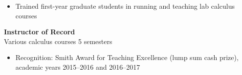 \documentclass[11pt]{article}
\newcommand{\textsb}[1]{ %
  {\fontseries{sb}\selectfont #1}
}
\def\colheight{60.3em}
\def\leftcolwidth{.375\textwidth}
\newcommand{\titlesize}{\large} %
\begin{document}
{\begin{minipage}[t][\colheight]{\leftcolwidth}
{\begin{itemize}
      \item Trained first-year graduate students in running and teaching lab
      calculus courses

    \end{itemize}
  }

  \vfill

  \textbf{\titlesize Instructor of Record}\\
  \textsb{Various calculus courses} \hfill 5 semesters

  {\small
    \begin{itemize}

      \item \textsb{Recognition:} Smith Award for Teaching Excellence (lump sum
      cash prize), academic years 2015--2016 and 2016--2017

    \end{itemize}
  }

\end{minipage}
} %
%
\hfill
%
%
\end{document}
